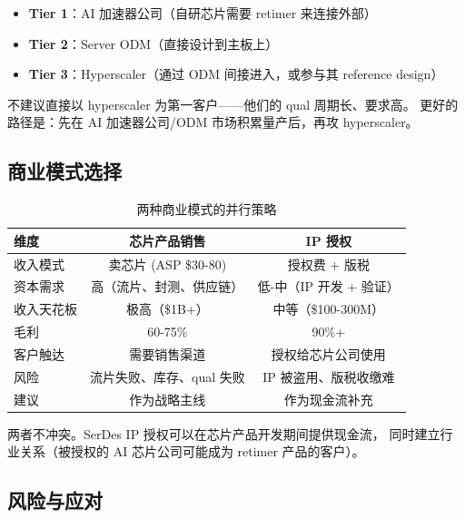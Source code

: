 \documentclass[11pt,a4paper]{ctexart}
\begin{document}
\begin{itemize}
    \item \textbf{Tier 1}：AI 加速器公司（自研芯片需要 retimer 来连接外部）
    \item \textbf{Tier 2}：Server ODM（直接设计到主板上）
    \item \textbf{Tier 3}：Hyperscaler（通过 ODM 间接进入，或参与其 reference design）
\end{itemize}

不建议直接以 hyperscaler 为第一客户——他们的 qual 周期长、要求高。
更好的路径是：先在 AI 加速器公司/ODM 市场积累量产后，再攻 hyperscaler。

\subsection{商业模式选择}

\begin{table}[htb]
    \centering
    \caption{两种商业模式的并行策略}
    \label{tab:business-model}
    \begin{tabular}{lcc}
        \toprule
        \textbf{维度} & \textbf{芯片产品销售} & \textbf{IP 授权} \\
        \midrule
        收入模式 & 卖芯片 (ASP \$30-80) & 授权费 + 版税 \\
        资本需求 & 高（流片、封测、供应链） & 低-中（IP 开发 + 验证） \\
        收入天花板 & 极高（\$1B+） & 中等（\$100-300M） \\
        毛利 & 60-75\% & 90\%+ \\
        客户触达 & 需要销售渠道 & 授权给芯片公司使用 \\
        风险 & 流片失败、库存、qual 失败 & IP 被盗用、版税收缴难 \\
        \midrule
        \rowcolor{highlight}
        建议 & 作为战略主线 & 作为现金流补充 \\
        \bottomrule
    \end{tabular}
\end{table}

两者不冲突。SerDes IP 授权可以在芯片产品开发期间提供现金流，
同时建立行业关系（被授权的 AI 芯片公司可能成为 retimer 产品的客户）。

\subsection{风险与应对}
\end{document}
